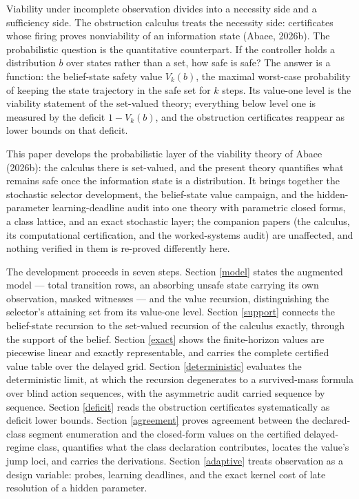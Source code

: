 \documentclass[10pt,twocolumn]{article}
\theoremstyle{plain}
\theoremstyle{definition}
\theoremstyle{remark}
\begin{document}
Viability under incomplete observation divides into a necessity side and a
sufficiency side. The obstruction calculus treats the necessity side:
certificates whose firing proves nonviability of an information state
(Abaee, 2026b). The probabilistic question is the quantitative counterpart.
If the controller holds a distribution \(b\) over states rather than a set,
how safe is safe? The answer is a function: the belief-state safety value
\(V_{k}(b)\), the maximal worst-case probability of keeping the state
trajectory in the safe set for \(k\) steps. Its value-one level is the
viability statement of the set-valued theory; everything below level one
is measured by the deficit \(1 - V_{k}(b)\), and the obstruction
certificates reappear as lower bounds on that deficit.

This paper develops the probabilistic layer of the viability theory of
Abaee (2026b): the calculus there is set-valued, and the present theory
quantifies what remains safe once the information state is a
distribution. It brings together the stochastic selector development, the
belief-state value campaign, and the hidden-parameter learning-deadline
audit into one theory with parametric closed forms, a class lattice, and
an exact stochastic layer; the companion papers (the calculus, its
computational certification, and the worked-systems audit) are unaffected,
and nothing verified in them is re-proved differently here.

The development proceeds in seven steps. Section \ref{model} states the
augmented model --- total transition rows, an absorbing unsafe state
carrying its own observation, masked witnesses --- and the value recursion,
distinguishing the selector's attaining set from its value-one level.
Section \ref{support} connects the belief-state recursion to the
set-valued recursion of the calculus exactly, through the support of the
belief. Section \ref{exact} shows the finite-horizon values are piecewise
linear and exactly representable, and carries the complete certified value
table over the delayed grid. Section \ref{deterministic} evaluates the
deterministic limit, at which the recursion degenerates to a
survived-mass formula over blind action sequences, with the asymmetric
audit carried sequence by sequence. Section \ref{deficit} reads the
obstruction certificates systematically as deficit lower bounds. Section \ref{agreement} proves agreement between the declared-class
segment enumeration and the closed-form values on the certified
delayed-regime class,
quantifies what the class declaration contributes, locates the value's
jump loci, and carries the derivations. Section \ref{adaptive} treats
observation as a design variable: probes, learning deadlines, and the
exact kernel cost of late resolution of a hidden parameter.
\end{document}

